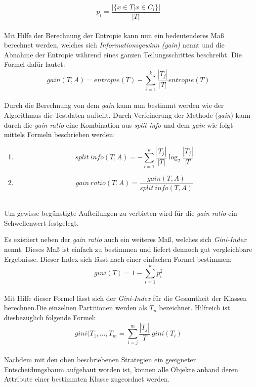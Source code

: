 \[p_i = \frac{|\{x \in T| x \in C_i\}|}{|T|}\] \\


Mit Hilfe der Berechnung der Entropie kann nun ein bedeutenderes Maß berechnet werden, welches sich \textit{Informationsgewinn (gain)} nennt und  die Abnahme der Entropie während eines ganzen Teilungsschrittes beschreibt. Die Formel dafür lautet: \\


\[gain(T,A) = entropie(T) - \displaystyle\sum_{i=1}^k \frac{|T_j|}{|T|} entropie(T) \]\\

Durch die Berechnung von dem \textit{gain} kann nun bestimmt werden wie der Algorithmus die Testdaten  aufteilt. Durch Verfeinerung  der Methode (\textit{gain}) kann durch die \textit{gain ratio} eine Kombination aus \textit{split info} und dem \textit{gain}  wie folgt mittels Formeln beschrieben werden: \\

 \begin{enumerate}
	 \item \[split\ info(T,A) = - \displaystyle\sum_{i=1}^k \frac{|T_j|}{|T|} \log_2 \frac{|T_j|}{|T|}\]
		\item \[gain\ ratio(T,A) = \frac{gain (T,A)}{split\ info(T,A)}\]\\
 \end{enumerate} 

Um gewisse begünstigte Aufteilungen zu verbieten wird für die \textit{gain ratio} ein Schwellenwert festgelegt.



Es existiert neben der \textit{gain ratio} auch ein weiteres Maß, welches sich \textit{Gini-Index} nennt. Dieses Maß ist einfach zu bestimmen und liefert dennoch gut vergleichbare Ergebnisse. Dieser Index sich lässt nach einer einfachen Formel bestimmen: \\

\[gini(T) = 1 - \displaystyle\sum_{i=1}^k p_i^2 \]\\


Mit Hilfe dieser Formel lässt sich der \textit{Gini-Index} für die Gesamtheit der Klassen berechnen.Die einzelnen Partitionen werden als \(T_n\) bezeichnet. Hilfreich ist diesbezüglich folgende Formel:\\


\[gini(T_1,\dotsc,T_m =  \displaystyle\sum_{i=j}^m \frac{|T_j|}{T}\ gini(T_i)\]\\


Nachdem mit den oben beschriebenen Strategien ein geeigneter Entscheidungsbaum aufgebaut worden ist, können alle Objekte anhand deren Attribute einer bestimmten Klasse zugeordnet werden. \cite{brei84,mitch97}


